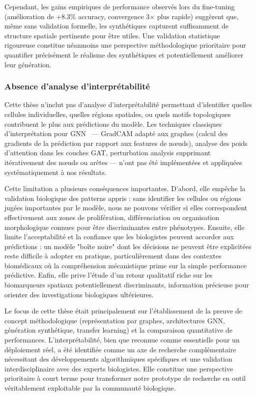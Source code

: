 Cependant, les gains empiriques de performance observés lors du fine-tuning (amélioration de +8.3\% accuracy, convergence 3× plus rapide) suggèrent que, même sans validation formelle, les synthétiques capturent suffisamment de structure spatiale pertinente pour être utiles. Une validation statistique rigoureuse constitue néanmoins une perspective méthodologique prioritaire pour quantifier précisément le réalisme des synthétiques et potentiellement améliorer leur génération.

\subsubsection{Absence d'analyse d'interprétabilité}

Cette thèse n'inclut pas d'analyse d'interprétabilité permettant d'identifier quelles cellules individuelles, quelles régions spatiales, ou quels motifs topologiques contribuent le plus aux prédictions du modèle. Les techniques classiques d'interprétation pour GNN~\cite{Yuan2020,Pope2019} — GradCAM adapté aux graphes (calcul des gradients de la prédiction par rapport aux features de nœuds), analyse des poids d'attention dans les couches GAT, perturbation analysis supprimant itérativement des nœuds ou arêtes — n'ont pas été implémentées et appliquées systématiquement à nos résultats.

Cette limitation a plusieurs conséquences importantes. D'abord, elle empêche la validation biologique des patterns appris : sans identifier les cellules ou régions jugées importantes par le modèle, nous ne pouvons vérifier si elles correspondent effectivement aux zones de prolifération, différenciation ou organisation morphologique connues pour être discriminantes entre phénotypes. Ensuite, elle limite l'acceptabilité et la confiance que les biologistes peuvent accorder aux prédictions : un modèle "boîte noire" dont les décisions ne peuvent être explicitées reste difficile à adopter en pratique, particulièrement dans des contextes biomédicaux où la compréhension mécanistique prime sur la simple performance prédictive. Enfin, elle prive l'étude d'un retour qualitatif riche sur les biomarqueurs spatiaux potentiellement discriminants, information précieuse pour orienter des investigations biologiques ultérieures.

Le focus de cette thèse était principalement sur l'établissement de la preuve de concept méthodologique (représentation par graphes, architectures GNN, génération synthétique, transfer learning) et la comparaison quantitative de performances. L'interprétabilité, bien que reconnue comme essentielle pour un déploiement réel, a été identifiée comme un axe de recherche complémentaire nécessitant des développements algorithmiques spécifiques et une validation interdisciplinaire avec des experts biologistes. Elle constitue une perspective prioritaire à court terme pour transformer notre prototype de recherche en outil véritablement exploitable par la communauté biologique.

